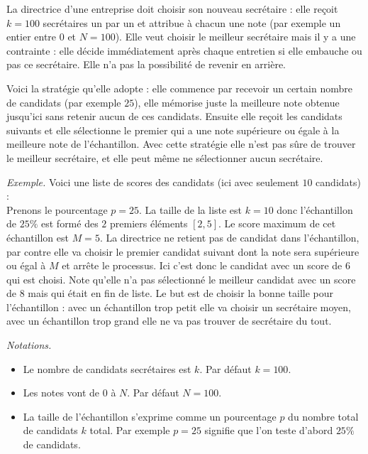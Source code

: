 \documentclass[11pt,class=report,crop=false]{standalone}
\begin{document}
\begin{cours}
	
La directrice d'une entreprise doit choisir son nouveau secrétaire : elle reçoit $k=100$ secrétaires un par un et attribue à chacun une note (par exemple un entier entre $0$ et $N=100$). Elle veut choisir le meilleur secrétaire mais il y a une contrainte : elle décide immédiatement après chaque entretien si elle embauche ou pas ce secrétaire. Elle n'a pas la possibilité de revenir en arrière.

Voici la stratégie qu'elle adopte : elle commence par recevoir un certain nombre de candidats (par exemple $25$), elle mémorise juste la meilleure note obtenue jusqu'ici sans retenir aucun de ces candidats. Ensuite elle reçoit les candidats suivants et elle sélectionne le premier qui a une note supérieure ou égale à la meilleure note de l'échantillon. Avec cette stratégie elle n'est pas sûre de trouver le meilleur secrétaire, et elle peut même ne sélectionner aucun secrétaire.

\bigskip

\emph{Exemple.}
Voici une liste de scores des candidats (ici avec seulement $10$ candidats) :\\
Prenons le pourcentage $p=25$.
La taille de la liste est $k=10$ donc l'échantillon de $25\%$
est formé des $2$ premiers éléments $[2,5]$. Le score maximum de cet échantillon est $M=5$. La directrice ne retient pas de candidat dans l'échantillon, par contre elle va  choisir le premier candidat suivant dont la note sera supérieure ou égal à $M$ et arrête le processus. Ici c'est donc le candidat avec un score de $6$ qui est choisi. Note qu'elle n'a pas sélectionné le meilleur candidat avec un score de $8$ mais qui était en fin de liste.
Le but est de choisir la bonne taille pour l'échantillon : avec un échantillon trop petit elle va choisir un secrétaire moyen, avec un échantillon trop grand elle ne va pas trouver de secrétaire du tout.

\bigskip

\emph{Notations.}
\begin{itemize}
	\item Le nombre de candidats secrétaires est $k$. Par défaut $k=100$.
	\item Les notes vont de $0$ à $N$. Par défaut $N=100$.
	\item La taille de l'échantillon s'exprime comme un pourcentage $p$ du nombre total de candidats $k$ total. Par exemple $p=25$ signifie que l'on teste d'abord $25\%$ de candidats.
\end{itemize}	
\end{cours}
\end{document}
